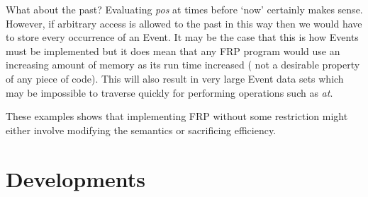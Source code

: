      What about the past? Evaluating \emph{pos} at times before `now' certainly makes sense. However, if arbitrary
      access is allowed to the past in this way then we would have to store every occurrence
      of an Event. It may be the case that this is how Events must be implemented but it does
      mean that any FRP program would use an increasing amount of memory as its run time increased (
      not a desirable property of any piece of code). This will also result in very large Event data sets which
      may be impossible to traverse quickly for performing operations such as \emph{at}.
      
      These examples shows that implementing FRP without some restriction might either involve modifying the
      semantics or sacrificing efficiency.

  \section{Developments}      
